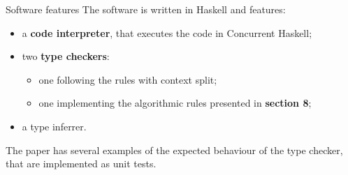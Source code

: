 \begin{frame}{Software features}
    The software is written in Haskell and features:
    \begin{itemize}
        \item a \textbf{code interpreter}, that executes the code in Concurrent Haskell;
        \item two \textbf{type checkers}:
        \begin{itemize}
            \item one following the rules with context split;
            \item one implementing the algorithmic rules presented in \textbf{section 8};
        \end{itemize}
        \item a type inferrer.
    \end{itemize}

    The paper has several examples of the expected behaviour of the type checker, that are implemented as unit tests.
\end{frame}



